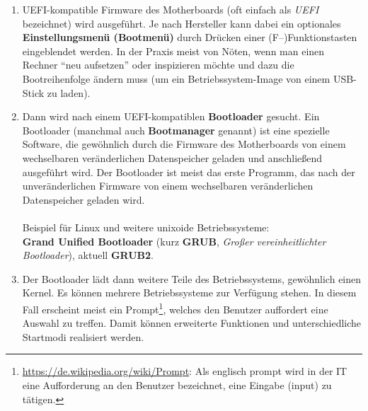\begin{enumerate}
	\item UEFI-kompatible Firmware des Motherboards (oft einfach als \textit{UEFI} bezeichnet) wird ausgeführt. Je nach Hersteller kann dabei ein optionales \textbf{Einstellungsmenü (\textbf{Bootmenü})} durch Drücken einer (F--)Funktionstasten eingeblendet werden. In der Praxis meist von Nöten, wenn man einen Rechner ``neu aufsetzen'' oder inspizieren möchte und dazu die Bootreihenfolge ändern muss (um ein Betriebssystem-Image von einem USB-Stick zu laden).
	\item Dann wird nach einem UEFI-kompatiblen \textbf{Bootloader} gesucht. Ein Bootloader (manchmal auch \textbf{Bootmanager} genannt) ist eine spezielle Software, die gewöhnlich durch die Firmware des Motherboards von einem wechselbaren veränderlichen Datenspeicher geladen und anschließend ausgeführt wird. Der Bootloader ist meist das erste Programm, das nach der unveränderlichen Firmware von einem wechselbaren veränderlichen Datenspeicher geladen wird.\\~\\
	Beispiel für Linux und weitere unixoide Betriebssysteme:\\ \textbf{Grand Unified Bootloader} (kurz \textbf{GRUB}, \textit{Großer vereinheitlichter Bootloader}), aktuell \textbf{GRUB2}.
\item Der Bootloader lädt dann weitere Teile des Betriebssystems, gewöhnlich einen Kernel. Es können mehrere Betriebssysteme zur Verfügung stehen. In diesem Fall erscheint meist ein Prompt\footnote{\hyperref{https://de.wikipedia.org/wiki/Prompt}{}{}{https://de.wikipedia.org/wiki/Prompt}: Als englisch prompt wird in der IT eine Aufforderung an den Benutzer bezeichnet, eine Eingabe (input) zu tätigen.}, welches den Benutzer auffordert eine Auswahl zu treffen. Damit können erweiterte Funktionen und unterschiedliche Startmodi realisiert werden.
\end{enumerate}
\clearpage
